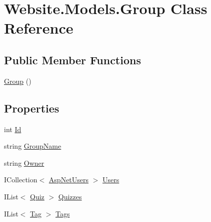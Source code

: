 \hypertarget{class_website_1_1_models_1_1_group}{}\section{Website.\+Models.\+Group Class Reference}
\label{class_website_1_1_models_1_1_group}
\subsection*{Public Member Functions}
\begin{DoxyCompactItemize}
\item 
\hyperlink{class_website_1_1_models_1_1_group_a8ea31af4d0945bb1a4a4eede7405a2e5}{Group} ()
\end{DoxyCompactItemize}
\subsection*{Properties}
\begin{DoxyCompactItemize}
\item 
int \hyperlink{class_website_1_1_models_1_1_group_ad83a7c7820d6876c8c1c17e4c6fd4e4a}{Id}
\item 
string \hyperlink{class_website_1_1_models_1_1_group_a178f285cb62642463f3f19ba886d6d66}{Group\+Name}
\item 
string \hyperlink{class_website_1_1_models_1_1_group_afb79d6716f7be31ea11a24eba425aee4}{Owner}
\item 
I\+Collection$<$ \hyperlink{class_website_1_1_asp_net_users}{Asp\+Net\+Users} $>$ \hyperlink{class_website_1_1_models_1_1_group_ae3d094a974671a87a39d964b94c7c1aa}{Users}
\item 
I\+List$<$ \hyperlink{class_website_1_1_models_1_1_quiz}{Quiz} $>$ \hyperlink{class_website_1_1_models_1_1_group_a22c383ca41607a2d85dc422d4da7c03c}{Quizzes}
\item 
I\+List$<$ \hyperlink{class_website_1_1_models_1_1_tag}{Tag} $>$ \hyperlink{class_website_1_1_models_1_1_group_a65c7d4d939e61ec00bdb5255e1d39f6a}{Tags}
\end{DoxyCompactItemize}


